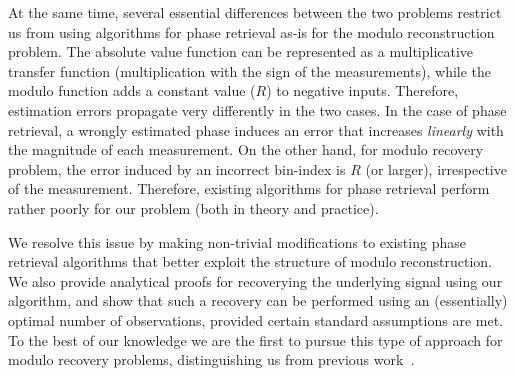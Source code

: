 At the same time, several essential differences between the two problems restrict us from using algorithms for phase retrieval as-is for the modulo reconstruction problem. The absolute value function can be represented as a multiplicative transfer function (multiplication with the sign of the measurements), while the modulo function adds a constant value ($R$) to negative inputs. %
Therefore, estimation errors propagate very differently in the two cases. In the case of phase retrieval, a wrongly estimated phase induces an error that increases \emph{linearly} with the magnitude of each measurement. %
On the other hand, for modulo recovery problem, the error induced by an incorrect bin-index is $R$ (or larger), irrespective of the measurement. Therefore, existing algorithms for phase retrieval perform rather poorly for our problem (both in theory and practice). %

We resolve this issue by making non-trivial modifications to existing phase retrieval algorithms that better exploit the structure of modulo reconstruction. We also provide analytical proofs for recoverying the underlying signal using our algorithm, and show that such a recovery can be performed using an (essentially) optimal number of observations, provided certain standard assumptions are met. To the best of our knowledge we are the first to pursue this type of approach for modulo recovery problems, distinguishing us from previous work~\cite{ICCP15_Zhao,Bhandari}. 

